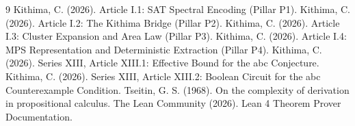 \documentclass[11pt,a4paper]{article}
\begin{document}

\begin{thebibliography}{9}
  Kithima, C. (2026). Article I.1: SAT Spectral Encoding (Pillar P1).
  Kithima, C. (2026). Article I.2: The Kithima Bridge (Pillar P2).
  Kithima, C. (2026). Article I.3: Cluster Expansion and Area Law (Pillar P3).
  Kithima, C. (2026). Article I.4: MPS Representation and Deterministic Extraction (Pillar P4).
  Kithima, C. (2026). Series XIII, Article XIII.1: Effective Bound for the abc Conjecture.
  Kithima, C. (2026). Series XIII, Article XIII.2: Boolean Circuit for the abc Counterexample Condition.
  Tseitin, G. S. (1968). On the complexity of derivation in propositional calculus.
  The Lean Community (2026). Lean 4 Theorem Prover Documentation.
\end{thebibliography}
\end{document}
